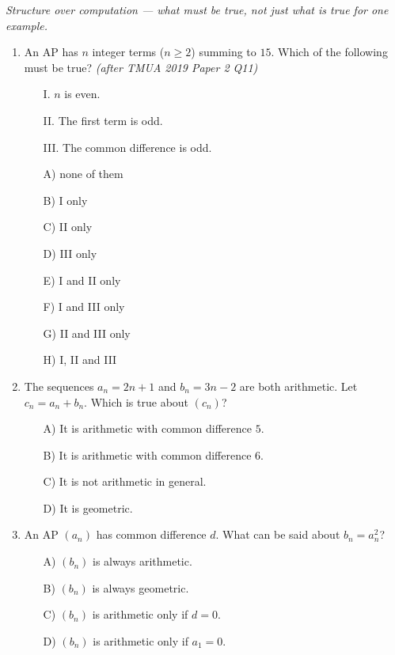 \documentclass[11pt,a4paper]{article}
\begin{document}
\noindent\textit{Structure over computation --- what must be true, not just what is true for one example.}

\begin{enumerate}

\item An AP has $n$ integer terms ($n\geq2$) summing to $15$. Which of the following must be true? \textit{\small(after TMUA 2019 Paper 2 Q11)}
\begin{itemize}
\item[I.] $n$ is even.
\item[II.] The first term is odd.
\item[III.] The common difference is odd.
\end{itemize}
\begin{itemize}
\item[A)] none of them
\item[B)] I only
\item[C)] II only
\item[D)] III only
\item[E)] I and II only
\item[F)] I and III only
\item[G)] II and III only
\item[H)] I, II and III
\end{itemize}

\item The sequences $a_n=2n+1$ and $b_n=3n-2$ are both arithmetic. Let $c_n=a_n+b_n$. Which is true about $(c_n)$?
\begin{itemize}
\item[A)] It is arithmetic with common difference $5$.
\item[B)] It is arithmetic with common difference $6$.
\item[C)] It is not arithmetic in general.
\item[D)] It is geometric.
\end{itemize}

\item An AP $(a_n)$ has common difference $d$. What can be said about $b_n=a_n^2$?
\begin{itemize}
\item[A)] $(b_n)$ is always arithmetic.
\item[B)] $(b_n)$ is always geometric.
\item[C)] $(b_n)$ is arithmetic only if $d=0$.
\item[D)] $(b_n)$ is arithmetic only if $a_1=0$.
\end{itemize}


\end{enumerate}
\end{document}
